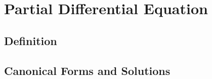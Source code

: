 \chapter{Partial Differential Equation}

\section{Definition}

\section{Canonical Forms and Solutions}
